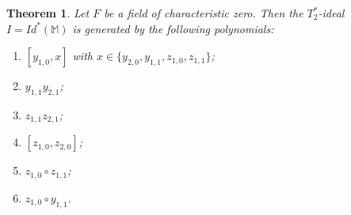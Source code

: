 \documentclass[10pt,a4paper]{amsart}
\newtheorem{theorem}{Theorem}[section]
\begin{document}
	

	\begin{theorem}\label{thm:main}
		Let $F$ be a field of characteristic zero. Then the $T_2^*$-ideal $I=Id^*(\mathbb M)$ is generated by the following polynomials:
		\begin{enumerate}
			\item $[y_{1, 0}, x]$ with $x\in \{y_{2,0},
			y_{1, 1}, z_{1, 0}, z_{1, 1}\}$;
			\item $y_{1, 1}y_{2, 1}$;
			\item $z_{1, 1}z_{2, 1}$;
			\item $[z_{1, 0}, z_{2, 0}]$;
			\item $z_{1, 0}\circ z_{1, 1}$;
			\item $z_{1, 0}\circ y_{1, 1}$.
		\end{enumerate}
	\end{theorem}
\end{document}
